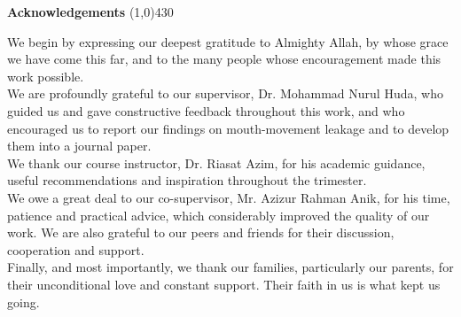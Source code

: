 


\clearpage
\setlength{\headheight}{12pt}\begin{center}
{\huge \bf Acknowledgements}
\line(1,0){430}
\end{center}



We begin by expressing our deepest gratitude to Almighty Allah, by whose grace we have come this far, and to the many people whose encouragement made this work possible.\\

We are profoundly grateful to our supervisor, Dr. Mohammad Nurul Huda, who guided us and gave constructive feedback throughout this work, and who encouraged us to report our findings on mouth-movement leakage and to develop them into a journal paper.\\

We thank our course instructor, Dr. Riasat Azim, for his academic guidance, useful recommendations and inspiration throughout the trimester.\\

We owe a great deal to our co-supervisor, Mr. Azizur Rahman Anik, for his time, patience and practical advice, which considerably improved the quality of our work. We are also grateful to our peers and friends for their discussion, cooperation and support.\\

Finally, and most importantly, we thank our families, particularly our parents, for their unconditional love and constant support. Their faith in us is what kept us going.
